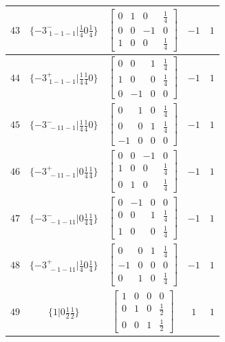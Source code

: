 \documentclass[fleqn,8pt]{jsarticle}
\begin{document}
\begin{longtable}{ccccc}
$ 43 $ & $ \{-3^{-}_{\,\,1-1-1}|\frac{1}{4} 0 \frac{1}{4}\} $ & $ \begin{bmatrix} 0 & 1 & 0 & \frac{1}{4} \\ 0 & 0 & -1 & 0 \\ 1 & 0 & 0 & \frac{1}{4} \end{bmatrix} $ & $ -1 $ & $ 1 $ \\ \hline
$ 44 $ & $ \{-3^{+}_{\,\,1-1-1}|\frac{1}{4} \frac{1}{4} 0\} $ & $ \begin{bmatrix} 0 & 0 & 1 & \frac{1}{4} \\ 1 & 0 & 0 & \frac{1}{4} \\ 0 & -1 & 0 & 0 \end{bmatrix} $ & $ -1 $ & $ 1 $ \\ \hline
$ 45 $ & $ \{-3^{-}_{\,\,-11-1}|\frac{1}{4} \frac{1}{4} 0\} $ & $ \begin{bmatrix} 0 & 1 & 0 & \frac{1}{4} \\ 0 & 0 & 1 & \frac{1}{4} \\ -1 & 0 & 0 & 0 \end{bmatrix} $ & $ -1 $ & $ 1 $ \\ \hline
$ 46 $ & $ \{-3^{+}_{\,\,-11-1}|0 \frac{1}{4} \frac{1}{4}\} $ & $ \begin{bmatrix} 0 & 0 & -1 & 0 \\ 1 & 0 & 0 & \frac{1}{4} \\ 0 & 1 & 0 & \frac{1}{4} \end{bmatrix} $ & $ -1 $ & $ 1 $ \\ \hline
$ 47 $ & $ \{-3^{-}_{\,\,-1-11}|0 \frac{1}{4} \frac{1}{4}\} $ & $ \begin{bmatrix} 0 & -1 & 0 & 0 \\ 0 & 0 & 1 & \frac{1}{4} \\ 1 & 0 & 0 & \frac{1}{4} \end{bmatrix} $ & $ -1 $ & $ 1 $ \\ \hline
$ 48 $ & $ \{-3^{+}_{\,\,-1-11}|\frac{1}{4} 0 \frac{1}{4}\} $ & $ \begin{bmatrix} 0 & 0 & 1 & \frac{1}{4} \\ -1 & 0 & 0 & 0 \\ 0 & 1 & 0 & \frac{1}{4} \end{bmatrix} $ & $ -1 $ & $ 1 $ \\ \hline
$ 49 $ & $ \{1|0 \frac{1}{2} \frac{1}{2}\} $ & $ \begin{bmatrix} 1 & 0 & 0 & 0 \\ 0 & 1 & 0 & \frac{1}{2} \\ 0 & 0 & 1 & \frac{1}{2} \end{bmatrix} $ & $ 1 $ & $ 1 $ \\ \hline

\end{longtable}
\end{document}
